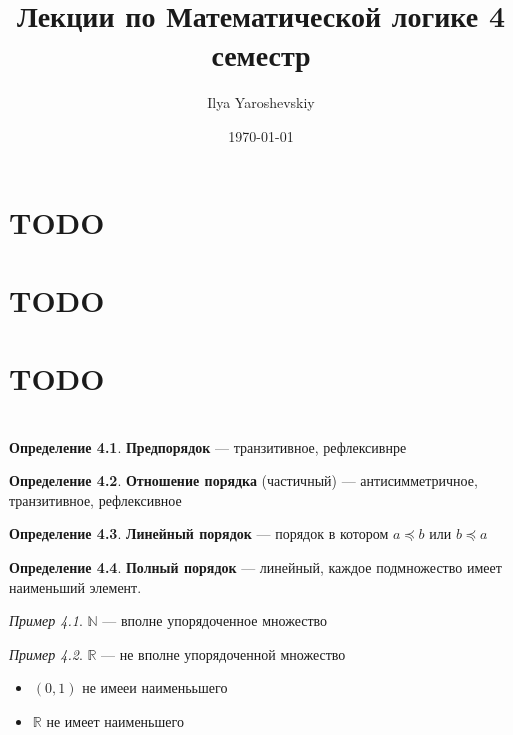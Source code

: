 \documentclass[oneside]{book}
\author{Ilya Yaroshevskiy}
\date{\today}
\title{Лекции по Математической логике 4 семестр}
\newcommand{\R}{\mathbb{R}}
\newcommand{\N}{\mathbb{N}}
\theoremstyle{plain}
\theoremstyle{remark}
\newtheorem*{examp}{Пример}
\theoremstyle{definition}
\newtheorem*{definition}{Определение}
\begin{document}
\maketitle
\tableofcontents


\chapter{TODO}
\label{sec:org0e6028a}
\chapter{TODO}
\label{sec:orged1d912}
\chapter{TODO}
\label{sec:orgbcce6ac}
\chapter{}
\label{sec:orgd4650e0}
\renewcommand{\P}{\mathcal{P}}
\newcommand{\A}{\mathcal{A}}
\newcommand{\L}{\mathcal{L}}
\newcommand{\B}{\mathcal{B}}


\begin{definition}
\textbf{Предпорядок} --- транзитивное, рефлексивнре
\end{definition}
\begin{definition}
\textbf{Отношение порядка} (частичный) --- антисимметричное, транзитивное, рефлексивное
\end{definition}
\begin{definition}
\textbf{Линейный порядок} --- порядок в котором \(a \preceq b\) или \(b \preceq a\)
\end{definition}
\begin{definition}
\textbf{Полный порядок} --- линейный, каждое подмножество имеет наименьший элемент. 
\end{definition}
\begin{examp}
\(\N\) --- вполне упорядоченное множество
\end{examp}
\begin{examp}
\(\R\) --- не вполне упорядоченной множество
\begin{itemize}
\item \((0, 1)\) не имееи наименььшего
\item \(\R\) не имеет наименьшего
\end{itemize}
\end{examp}
\end{document}
